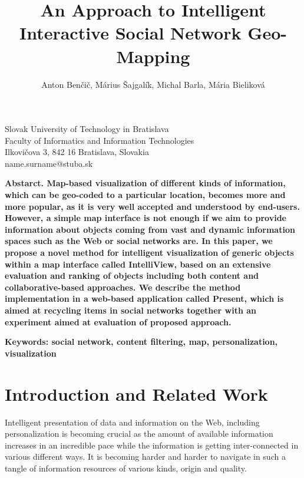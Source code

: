 \documentclass[10pt]{article}
\begin{document}
\title{\bf \Large An Approach to Intelligent Interactive Social Network Geo-Mapping \normalsize \rm}

\author{Anton Benčič, Márius Šajgalík, Michal Barla, Mária Bieliková}
\date{}
\maketitle
\begin{center}
Slovak University of Technology in Bratislava\\
Faculty of Informatics and Information Technologies\\
Ilkovičova 3, 842 16 Bratislava, Slovakia\\
{name.surname}@stuba.sk\\
\end{center}

\begin{description}
 \item \bf Abstarct. \rm Map-based visualization of different kinds of information, which can be geo-coded to a particular location, becomes more and more popular, as it is very well accepted and understood by end-users. However, a simple map interface is not enough if we aim to provide information about objects coming from vast and dynamic information spaces such as the Web or social networks are. In this paper, we propose a novel method for intelligent visualization of generic objects within a map interface called IntelliView, based on an extensive evaluation and ranking of objects including both content and collaborative-based approaches. We describe the method implementation in a web-based application called Present, which is aimed at recycling items in social networks together with an experiment aimed at evaluation of proposed approach.
\end{description}
\begin{description}
\item \bf Keywords: \rm social network, content filtering, map, personalization, visualization
\end{description} 


\section{Introduction and Related Work}
Intelligent presentation of data and information on the Web, including personalization is becoming crucial as the amount of available information increases in an incredible pace while the information is getting inter-connected in various different ways. It is becoming harder and harder to navigate in such a tangle of information resources of various kinds, origin and quality.
\end{document}
